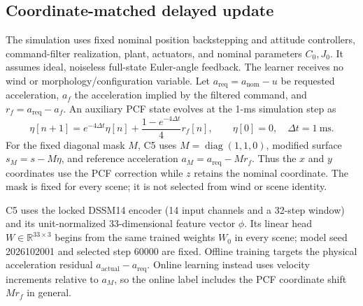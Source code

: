 \documentclass[11pt]{article}
\begin{document}
\subsection{Coordinate-matched delayed update}
The simulation uses fixed nominal position backstepping and attitude controllers, command-filter realization, plant, actuators, and nominal parameters $C_0,J_0$. It assumes ideal, noiseless full-state Euler-angle feedback. The learner receives no wind or morphology/configuration variable. Let $a_{\mathrm{req}}=a_{\mathrm{nom}}-u$ be requested acceleration, $a_f$ the acceleration implied by the filtered command, and $r_f=a_{\mathrm{req}}-a_f$. An auxiliary PCF state evolves at the 1-ms simulation step as
\begin{equation}
  \eta[n+1]=e^{-4\Delta t}\eta[n]
       +\frac{1-e^{-4\Delta t}}{4}r_f[n],
  \qquad \eta[0]=0, \quad \Delta t=1~\mathrm{ms}.
\end{equation}
For the fixed diagonal mask $M$, C5 uses $M=\operatorname{diag}(1,1,0)$, modified surface $s_M=s-M\eta$, and reference acceleration $a_M=a_{\mathrm{req}}-Mr_f$. Thus the $x$ and $y$ coordinates use the PCF correction while $z$ retains the nominal coordinate. The mask is fixed for every scene; it is not selected from wind or scene identity.

C5 uses the locked DSSM14 encoder (14 input channels and a 32-step window) and its unit-normalized 33-dimensional feature vector $\phi$. Its linear head $W\in\mathbb{R}^{33\times3}$ begins from the same trained weights $W_0$ in every scene; model seed 2026102001 and selected step 60000 are fixed. Offline training targets the physical acceleration residual $a_{\mathrm{actual}}-a_{\mathrm{req}}$. Online learning instead uses velocity increments relative to $a_M$, so the online label includes the PCF coordinate shift $Mr_f$ in general.
\end{document}

